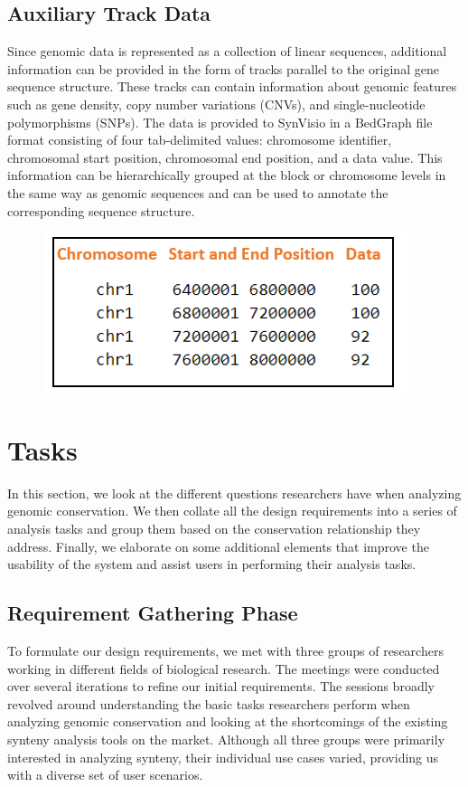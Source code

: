\subsection{Auxiliary Track Data}
Since genomic data is represented as a collection of linear sequences, additional information can be provided in the form of tracks parallel to the original gene sequence structure. These tracks can contain information about genomic features such as gene density, copy number variations (CNVs), and single-nucleotide polymorphisms (SNPs). The data is provided to SynVisio in a BedGraph file format consisting of four tab-delimited values: chromosome identifier, chromosomal start position, chromosomal end position, and a data value. This information can be hierarchically grouped at the block or chromosome levels in the same way as genomic sequences and can be used to annotate the corresponding sequence structure. 

\begin{figure}
  \centering
  \includegraphics[width=.45\linewidth]{images/ch_3_track_file.PNG}
  \label{fig:ch_3_track_file}
\end{figure}

\section{Tasks}

In this section, we look at the different questions researchers have when analyzing genomic conservation. We then collate all the design requirements into a series of analysis tasks and group them based on the conservation relationship they address. Finally, we elaborate on some additional elements that improve the usability of the system and assist users in performing their analysis tasks.

\subsection{Requirement Gathering Phase}
To formulate our design requirements, we met with three groups of researchers working in different fields of biological research. The meetings were conducted over several iterations to refine our initial requirements. The sessions broadly revolved around understanding the basic tasks researchers perform when analyzing genomic conservation and looking at the shortcomings of the existing synteny analysis tools on the market. Although all three groups were primarily interested in analyzing synteny, their individual use cases varied, providing us with a diverse set of user scenarios.

